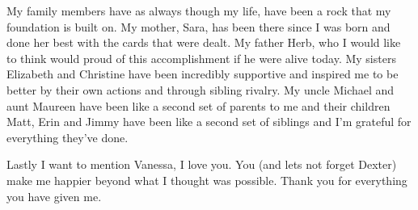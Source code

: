 My family members have as always though my life, have been a rock that my foundation is built on. My mother, Sara, has been there since I was born and done her best with the cards that were dealt. My father Herb, who I would like to think would proud of this accomplishment if he were alive today. My sisters Elizabeth and Christine have been incredibly supportive and inspired me to be better by their own actions and through sibling rivalry. My uncle Michael and aunt Maureen have been like a second set of parents to me and their children Matt, Erin and Jimmy have been like a second set of siblings and I'm grateful for everything they've done.

Lastly I want to mention Vanessa, I love you. You (and lets not forget Dexter) make me happier beyond what I thought was possible. Thank you for everything you have given me.



\vskip 1in

\noindent
